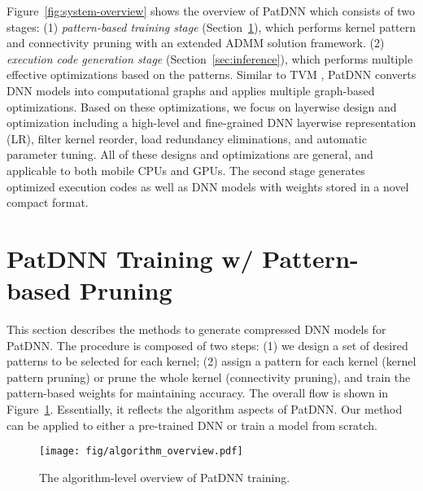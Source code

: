 \documentclass[sigplan,screen]{acmart}
\newcommand{\projectname}{PatDNN\xspace}
\begin{document}
Figure~\ref{fig:system-overview} 
shows the overview of \projectname which consists of
two stages:
(1) {\em pattern-based training stage} (Section~\ref{sec:training}), which
performs kernel pattern and connectivity pruning
with an extended ADMM solution framework. 
(2) {\em execution code generation stage} (Section~\ref{sec:inference}), which
performs multiple effective optimizations based
on the patterns. 
Similar to TVM \cite{chen2018tvm}, \projectname converts DNN models into computational graphs and applies multiple graph-based optimizations. 
Based on these optimizations, we focus on
layerwise design and optimization including 
a high-level and fine-grained DNN layerwise representation (LR), filter kernel reorder, load redundancy eliminations, and automatic parameter tuning. All of these designs and optimizations are general, 
and applicable to both mobile CPUs and GPUs.
The second stage generates optimized execution codes as well as DNN models with weights stored in a novel compact format. 



























 \section{PatDNN Training w/ Pattern-based Pruning}\label{sec:training}

This section describes the methods to generate
compressed DNN models for \projectname. 
The procedure is composed of two steps:
(1) we design a set of desired patterns to be 
selected for each kernel;
(2) assign a pattern for each kernel (kernel pattern pruning) or prune the whole kernel (connectivity pruning), and train the pattern-based weights for maintaining accuracy. 
The overall flow is shown in Figure~\ref{fig:algorithm-overview}.
Essentially, it reflects the algorithm aspects of 
\projectname.
Our method can be applied to either
a pre-trained DNN or train a model 
from scratch. 





\begin{figure}[t]\centering
    \texttt{[image: fig/algorithm\_overview.pdf]}
\caption{The algorithm-level overview of PatDNN training.}
    \label{fig:algorithm-overview}
\end{figure}
\end{document}
